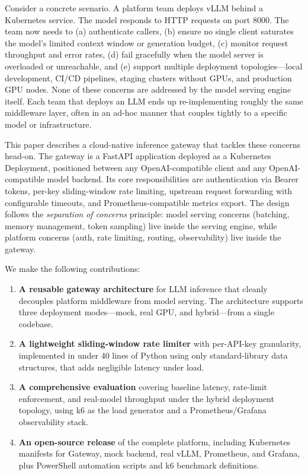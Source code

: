 \documentclass[10pt,journal]{IEEEtran}
\begin{document}
Consider a concrete scenario. A platform team deploys vLLM behind a Kubernetes service. The model responds to HTTP requests on port 8000. The team now needs to (a) authenticate callers, (b) ensure no single client saturates the model's limited context window or generation budget, (c) monitor request throughput and error rates, (d) fail gracefully when the model server is overloaded or unreachable, and (e) support multiple deployment topologies---local development, CI/CD pipelines, staging clusters without GPUs, and production GPU nodes. None of these concerns are addressed by the model serving engine itself. Each team that deploys an LLM ends up re-implementing roughly the same middleware layer, often in an ad-hoc manner that couples tightly to a specific model or infrastructure.

This paper describes a cloud-native inference gateway that tackles these concerns head-on. The gateway is a FastAPI application deployed as a Kubernetes Deployment, positioned between any OpenAI-compatible client and any OpenAI-compatible model backend. Its core responsibilities are authentication via Bearer tokens, per-key sliding-window rate limiting, upstream request forwarding with configurable timeouts, and Prometheus-compatible metrics export. The design follows the \emph{separation of concerns} principle: model serving concerns (batching, memory management, token sampling) live inside the serving engine, while platform concerns (auth, rate limiting, routing, observability) live inside the gateway.

We make the following contributions:

\begin{enumerate}
  \item \textbf{A reusable gateway architecture} for LLM inference that cleanly decouples platform middleware from model serving. The architecture supports three deployment modes---mock, real GPU, and hybrid---from a single codebase.
  \item \textbf{A lightweight sliding-window rate limiter} with per-API-key granularity, implemented in under 40 lines of Python using only standard-library data structures, that adds negligible latency under load.
  \item \textbf{A comprehensive evaluation} covering baseline latency, rate-limit enforcement, and real-model throughput under the hybrid deployment topology, using k6 as the load generator and a Prometheus/Grafana observability stack.
  \item \textbf{An open-source release} of the complete platform, including Kubernetes manifests for Gateway, mock backend, real vLLM, Prometheus, and Grafana, plus PowerShell automation scripts and k6 benchmark definitions.
\end{enumerate}
\end{document}
